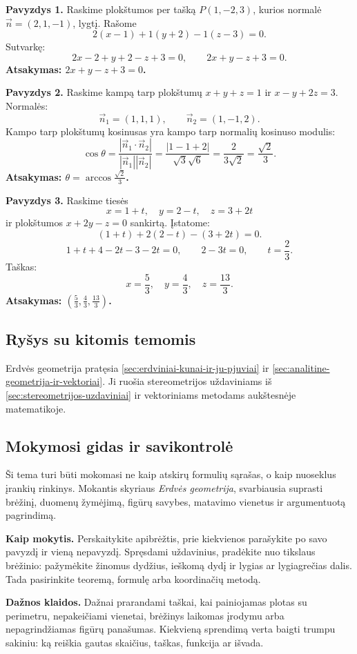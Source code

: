 \textbf{Pavyzdys 1.} Raskime plokštumos per tašką $P(1,-2,3)$, kurios normalė $\vec n=(2,1,-1)$, lygtį. Rašome
\[
2(x-1)+1(y+2)-1(z-3)=0.
\]
Sutvarkę:
\[
2x-2+y+2-z+3=0,\qquad 2x+y-z+3=0.
\]
\textbf{Atsakymas: $2x+y-z+3=0$.}

\textbf{Pavyzdys 2.} Raskime kampą tarp plokštumų $x+y+z=1$ ir $x-y+2z=3$. Normalės:
\[
\vec n_1=(1,1,1),\qquad \vec n_2=(1,-1,2).
\]
Kampo tarp plokštumų kosinusas yra kampo tarp normalių kosinuso modulis:
\[
\cos\theta=\frac{|\vec n_1\cdot\vec n_2|}{|\vec n_1||\vec n_2|}
=\frac{|1-1+2|}{\sqrt3\sqrt6}=\frac{2}{3\sqrt2}=\frac{\sqrt2}{3}.
\]
\textbf{Atsakymas: $\theta=\arccos\frac{\sqrt2}{3}$.}

\textbf{Pavyzdys 3.} Raskime tiesės
\[
x=1+t,\quad y=2-t,\quad z=3+2t
\]
ir plokštumos $x+2y-z=0$ sankirtą. Įstatome:
\[
(1+t)+2(2-t)-(3+2t)=0.
\]
\[
1+t+4-2t-3-2t=0,\qquad 2-3t=0,\qquad t=\frac23.
\]
Taškas:
\[
x=\frac53,\quad y=\frac43,\quad z=\frac{13}{3}.
\]
\textbf{Atsakymas: $\left(\frac53,\frac43,\frac{13}{3}\right)$.}

\subsection{Ryšys su kitomis temomis}

Erdvės geometrija pratęsia \ref{sec:erdviniai-kunai-ir-ju-pjuviai} ir \ref{sec:analitine-geometrija-ir-vektoriai}. Ji ruošia stereometrijos uždaviniams iš \ref{sec:stereometrijos-uzdaviniai} ir vektoriniams metodams aukštesnėje matematikoje.

\subsection{Mokymosi gidas ir savikontrolė}

Ši tema turi būti mokomasi ne kaip atskirų formulių sąrašas, o kaip nuoseklus įrankių rinkinys. Mokantis skyriaus \textit{Erdvės geometrija}, svarbiausia suprasti brėžinį, duomenų žymėjimą, figūrų savybes, matavimo vienetus ir argumentuotą pagrindimą.

\textbf{Kaip mokytis.} Perskaitykite apibrėžtis, prie kiekvienos parašykite po savo pavyzdį ir vieną nepavyzdį. Spręsdami uždavinius, pradėkite nuo tikslaus brėžinio: pažymėkite žinomus dydžius, ieškomą dydį ir lygias ar lygiagrečias dalis. Tada pasirinkite teoremą, formulę arba koordinačių metodą.

\textbf{Dažnos klaidos.} Dažnai prarandami taškai, kai painiojamas plotas su perimetru, nepakeičiami vienetai, brėžinys laikomas įrodymu arba nepagrindžiamas figūrų panašumas. Kiekvieną sprendimą verta baigti trumpu sakiniu: ką reiškia gautas skaičius, taškas, funkcija ar išvada.

